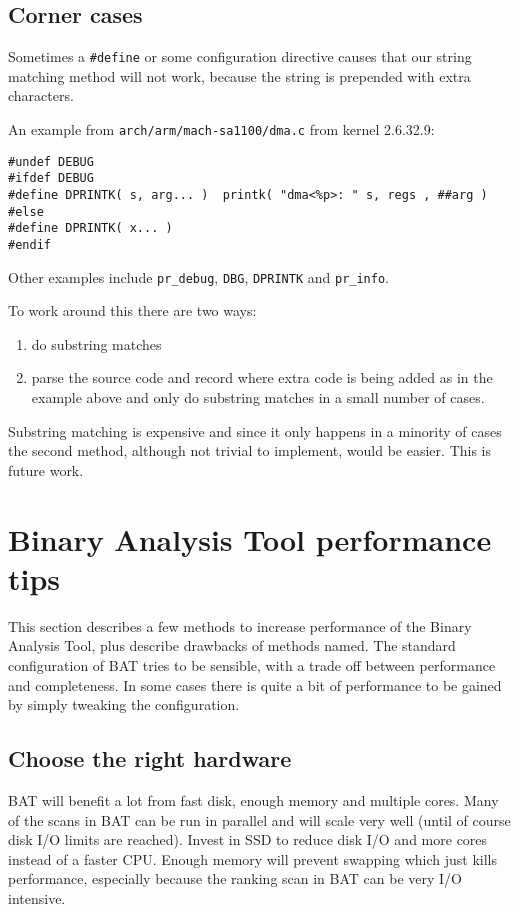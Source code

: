 \documentclass[10pt]{article}
\begin{document}
\subsection{Corner cases}

Sometimes a \texttt{\#define} or some configuration directive causes that our 
string matching method will not work, because the string is prepended with
extra characters.

An example from \texttt{arch/arm/mach-sa1100/dma.c} from kernel 2.6.32.9:

\begin{verbatim}
#undef DEBUG
#ifdef DEBUG
#define DPRINTK( s, arg... )  printk( "dma<%p>: " s, regs , ##arg )
#else
#define DPRINTK( x... )
#endif
\end{verbatim}

Other examples include \texttt{pr\_debug}, \texttt{DBG}, \texttt{DPRINTK} and
\texttt{pr\_info}.

To work around this there are two ways:

\begin{enumerate}
\item do substring matches
\item parse the source code and record where extra code is being added as in
the example above and only do substring matches in a small number of cases.
\end{enumerate}

Substring matching is expensive and since it only happens in a minority of
cases the second method, although not trivial to implement, would be easier.
This is future work.

\section{Binary Analysis Tool performance tips}

This section describes a few methods to increase performance of the Binary
Analysis Tool, plus describe drawbacks of methods named. The standard
configuration of BAT tries to be sensible, with a trade off between performance
and completeness. In some cases there is quite a bit of performance to be
gained by simply tweaking the configuration.

\subsection{Choose the right hardware}

BAT will benefit a lot from fast disk, enough memory and multiple cores. Many
of the scans in BAT can be run in parallel and will scale very well (until
of course disk I/O limits are reached). Invest in SSD to reduce disk I/O and
more cores instead of a faster CPU. Enough memory will prevent swapping which
just kills performance, especially because the ranking scan in BAT can be very
I/O intensive.
\end{document}

